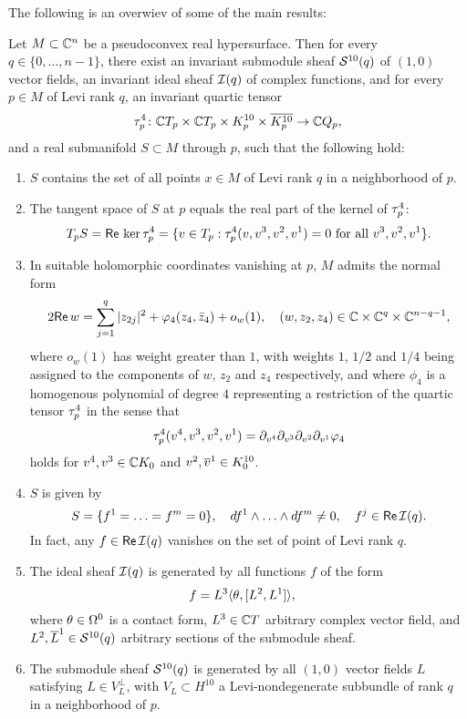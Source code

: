 \documentclass[12pt]{amsart}
\begin{document}
\bigskip
The following is an overwiev of some of the main results:


\bt{}
Let $M\subset{{\mathbb{C}}^n}$ be a pseudoconvex real hypersurface.
Then for every $q\in \{0, \ldots, n-1\}$, there exist 
an invariant submodule sheaf ${\mathcal{S}}^{10}(q)$ of $(1,0)$ vector fields,
an invariant ideal sheaf ${\mathcal{I}}(q)$ of complex functions,
and for every $p\in M$ of Levi rank $q$,
an invariant quartic tensor
$$
	\tau^4_p \colon  {\mathbb{C}} T_p \times {\mathbb{C}} T_p 
	\times K^{10}_p\times \overline{K^{10}_p} \to {\mathbb{C}} Q_p,
$$
and
a real submanifold $S\subset M$ through $p$,
such that the following hold:

\begin{enumerate}

\item 
$S$ contains the set of all points $x\in M$ of Levi rank $q$
in a neighborhood of $p$.

\item
The tangent space of $S$ at $p$ equals the real part of the kernel of $\tau^4_p$:
$$
	T_p S = {\sf Re}\,\ker \tau^4_p = \{ v\in T_p :  \tau^4_p(v, v^3, v^2, v^1) = 0 
	\text{ for all } v^3, v^2, v^1 \}.
$$


\item
In suitable holomorphic coordinates vanishing at $p$,
$M$ admits the normal form
$$
	2{\sf Re}\, w = \sum_{j=1}^q |z_{2j}|^2 + \varphi_4(z_4,{\bar z}_4) + o_w(1),
	\quad
	(w, z_2, z_4)\in {\mathbb{C}}\times {\mathbb{C}}^{q}\times {\mathbb{C}}^{n-q-1},
$$
where $o_w(1)$ has weight greater than $1$,
with weights $1$, $1/2$ and $1/4$ being assigned to
the components of $w$, $z_2$ and $z_4$ respectively,
and 
where $\phi_4$ is a homogenous polynomial of degree $4$
representing a restriction of the quartic tensor $\tau^4_p$ in the sense that
$$
	\tau^4_p(v^4, v^3, v^2, v^1) 
	= \partial_{v^4} \partial_{v^3} \partial_{v^2} \partial_{v^1} \varphi_4
$$
holds for $v^4, v^3\in {\mathbb{C}} K_0$
and
$v^2, \overline{v}^1\in K^{10}_0$.

\item
$S$ is given by 
$$
	S = \{f^1 = \ldots = f^m =0\},
	\quad
	df^1\wedge \ldots \wedge df^m \ne 0,
	\quad
	f^j \in {\sf Re}\, {\mathcal{I}}(q).
$$
In fact, any $f\in {\sf Re}\, {\mathcal{I}}(q)$ vanishes
on the set of point of Levi rank $q$. 

\item
The ideal sheaf ${\mathcal{I}}(q)$
is generated by all functions $f$ of the form
$$
	f = L^3 \langle \theta, [L^2, L^1] \rangle,
	\quad 
$$
where $\theta\in\Omega^0$ is a contact form, 
$L^3\in {\mathbb{C}} T$ arbitrary complex vector field,
and $L^2, \overline{L}^1 \in {\mathcal{S}}^{10}(q)$
arbitrary sections of the submodule sheaf.

\item
The submodule sheaf ${\mathcal{S}}^{10}(q)$
is generated by all $(1,0)$ vector fields $L$
satisfying $L\in V_L^\perp$,
with $V_L\subset H^{10}$
a Levi-nondegenerate subbundle
of rank $q$ in a neighborhood of $p$.

\end{enumerate}
\end{document}
